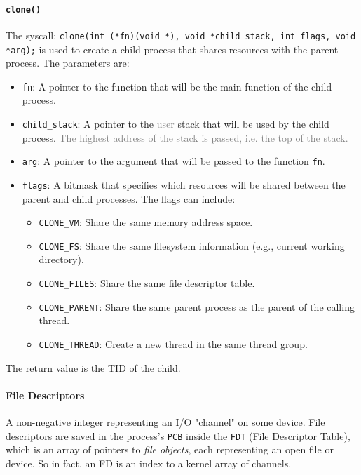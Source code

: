 \documentclass[openany,12pt]{book}
\newcommand{\code}[1]{\texttt{#1}}
\newcommand{\gray}[1]{\textcolor{gray}{#1}}
\begin{document}
\paragraph{\code{clone()}} The syscall:
\code{clone(int (*fn)(void *), void *child\_stack, int flags, void *arg);}  
is used to create a child process that shares resources with the parent process. The parameters are:
\begin{itemize}
  \item \code{fn}: A pointer to the function that will be the main function of the child process.
  \item \code{child\_stack}: A pointer to the \gray{user} stack that will be used by the child process. \gray{The highest address of the stack is passed, i.e. the top of the stack.}
  \item \code{arg}: A pointer to the argument that will be passed to the function \code{fn}.
  \item \code{flags}: A bitmask that specifies which resources will be shared between the parent and child processes. The flags can include:
  \begin{itemize}
    \item \code{CLONE\_VM}: Share the same memory address space.
    \item \code{CLONE\_FS}: Share the same filesystem information (e.g., current working directory).
    \item \code{CLONE\_FILES}: Share the same file descriptor table.
    \item \code{CLONE\_PARENT}: Share the same parent process as the parent of the calling thread.
    \item \code{CLONE\_THREAD}: Create a new thread in the same thread group.
  \end{itemize}
\end{itemize}
The return value is the TID of the child.






\paragraph{File Descriptors} A non-negative integer representing an I/O "channel" on some device. File descriptors are saved in the process's \code{PCB} inside the \code{FDT} (File Descriptor Table), which is an array of pointers to \textit{file objects}, each representing an open file or device. So in fact, an FD is an index to a kernel array of channels.
\end{document}
